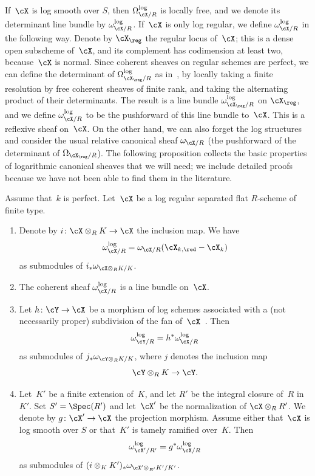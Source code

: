 If~$\cX$ is log smooth over $S$, then $\Omega^{\log}_{\cX/R}$ is locally free, and we denote its determinant line bundle by
$\omega_{\cX/R}^{\log}$.
If~$\cX$ is only log regular, we define $\omega_{\cX/R}^{\log}$ in the following way. Denote by $\cX_{\reg}$ the regular locus of~$\cX$; this is a dense open subscheme of~$\cX$, and its complement has codimension at least two, because~$\cX$ is normal. Since coherent sheaves on regular schemes are perfect, we can define the determinant of $\Omega^{\log}_{\cX_{\reg}/R}$ as in~\cite{knudsen-mumford}, by locally taking a finite resolution by free coherent sheaves of finite rank, and taking the alternating product of their determinants. The result is a line bundle $\omega_{\cX_{\reg}/R}^{\log}$ on $\cX_{\reg}$, and we define $\omega^{\log}_{\cX/R}$ to be the pushforward of this line bundle to~$\cX$. This is a reflexive sheaf on~$\cX$. On the other hand, we can also forget the log structures and consider the usual relative canonical sheaf $\omega_{\cX/R}$ (the pushforward of the determinant of
$\Omega_{\cX_{\reg}/R}$). The following proposition collects the basic properties of logarithmic canonical sheaves that we will need; we include detailed proofs because we have not been able to find them in the literature.

\begin{prop}\label{prop:can}
Assume that~$k$ is perfect.
Let~$\cX$ be a log regular separated flat $R$\nobreakdash-scheme of finite type.
\begin{enumerate}
\item \label{it:logcan} Denote by $i\colon \cX\otimes_R K\to \cX$ the inclusion map. We have
\[
\omega^{\log}_{\cX/R}=\omega_{\cX/R}(\cX_{k,\red}-\cX_k)
\]
as submodules of $i_\ast \omega_{\cX\otimes_R K/K}$.
\item \label{it:lineb} The coherent sheaf $\omega^{\log}_{\cX/R}$ is a line bundle on~$\cX$.
\item \label{it:loget}
Let $h\colon \cY\to \cX$ be a morphism of log schemes associated with a (not necessarily proper) subdivision of the fan of~$\cX$~\cite[9.9]{kato}. Then
\[
\omega^{\log}_{\cY/R}=h^{\ast}\omega^{\log}_{\cX/R}
\]
as submodules of $j_\ast \omega_{\cY\otimes_R K/K}$, where $j$ denotes the inclusion map
\[
\cY\otimes_R K\to \cY.
\]
\item \label{it:canbc} Let~$K'$ be a finite extension of~$K$, and let $R'$ be the integral closure of~$R$ in~$K'$.
Set $S'=\Spec(R')$ and let~$\cX'$ be the normalization of $\cX\otimes_R R'$. We denote by $g\colon \cX'\to \cX$ the projection morphism.
Assume either that~$\cX$ is log smooth over $S$ or that~$K'$ is tamely ramified over~$K$.
Then
\[
\omega^{\log}_{\cX'/R'}=g^{\ast}\omega^{\log}_{\cX/R}
\]
as submodules of $(i\otimes_K K')_\ast \omega_{\cX'\otimes_{R'} K'/K'}$.
\end{enumerate}
\end{prop}

